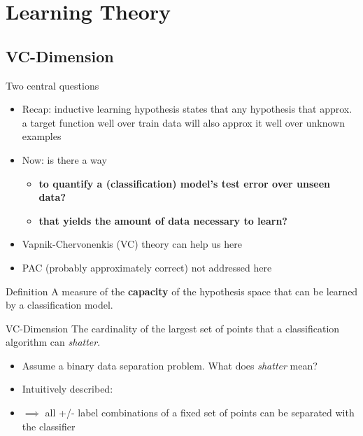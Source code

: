 \documentclass{beamer}
\begin{document}
\section{Learning Theory}
\subsection{VC-Dimension}

\begin{frame}{Two central questions}
\begin{itemize}
\item Recap: inductive learning hypothesis states that any hypothesis that approx. a target function well over train data will also approx it well over unknown examples
\item Now: is there a way 
  \begin{itemize}
  \item \textbf{to quantify a (classification) model's test error over unseen data?}
  \item \textbf{that yields the amount of data necessary to learn?}
  \end{itemize}
\item Vapnik-Chervonenkis (VC) theory can help us here \cite{VapnikV.N.Chervonenkis1971}
\item PAC (probably approximately correct) not addressed here
\end{itemize}
\end{frame}

\begin{frame}{Definition}
A measure of the \textbf{capacity} of the hypothesis space that can be learned by a classification model.
\begin{block}{VC-Dimension}
The cardinality of the largest set of points that a classification algorithm can \emph{shatter}.
\end{block}

\begin{itemize}
\item Assume a binary data separation problem. What does \emph{shatter} mean? 
\item Intuitively described:
\item $\implies$  all +/- label combinations of a fixed set of points can be separated with the classifier
\end{itemize}
\end{frame}
\end{document}
